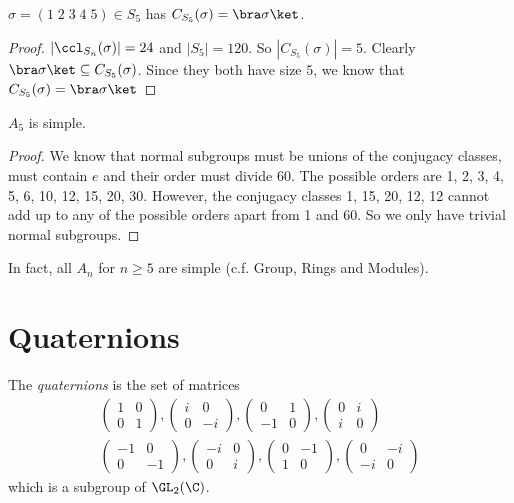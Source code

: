 \documentclass[a4paper]{article}
\begin{document}
  \begin{lemma}
    $\sigma = (1\; 2\; 3\; 4\; 5)\in S_5$ has $C_{S_5}(\sigma) = \bra \sigma \ket$. \end{lemma}

  \begin{proof}
    $|\ccl_{S_n}(\sigma)| = 24$ and $|S_5| = 120$. So $|C_{S_5}(\sigma)| = 5$. Clearly $\bra \sigma \ket \subseteq C_{S_5}(\sigma)$. Since they both have size $5$, we know that $C_{S_5}(\sigma) = \bra \sigma\ket$
  \end{proof}

  \begin{thm}
    $A_5$ is simple.
  \end{thm}

  \begin{proof}
    We know that normal subgroups must be unions of the conjugacy classes, must contain $e$ and their order must divide 60. The possible orders are 1, 2, 3, 4, 5, 6, 10, 12, 15, 20, 30. However, the conjugacy classes 1, 15, 20, 12, 12 cannot add up to any of the possible orders apart from 1 and 60. So we only have trivial normal subgroups.
  \end{proof}
  In fact, all $A_n$ for $n\geq 5$ are simple (c.f. Group, Rings and Modules).

  \section{Quaternions}
  \begin{defi}[Quaternions]
    The \emph{quaternions} is the set of matrices
    \begin{gather*}
      \begin{pmatrix}
        1&0\\0&1
      \end{pmatrix}, 
      \begin{pmatrix}
        i & 0\\0&-i
      \end{pmatrix},
      \begin{pmatrix}
        0&1\\-1&0
      \end{pmatrix},
      \begin{pmatrix}
        0&i\\i&0
      \end{pmatrix}
      \\
      \begin{pmatrix}
        -1&0\\0&-1
      \end{pmatrix}, 
      \begin{pmatrix}
        -i & 0\\0&i
      \end{pmatrix},
      \begin{pmatrix}
        0&-1\\1&0
      \end{pmatrix},
      \begin{pmatrix}
        0&-i\\-i&0
      \end{pmatrix}
    \end{gather*}
    which is a subgroup of $\GL_2(\C)$.
  \end{defi}
\end{document}
